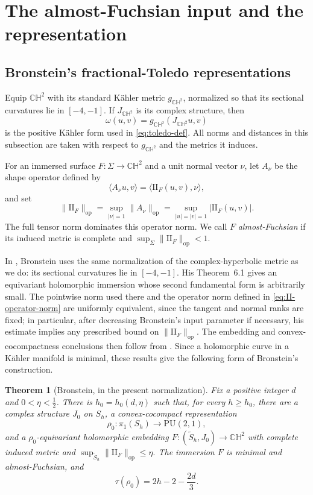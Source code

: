 \documentclass[12pt]{amsart}
\newtheorem{theorem}{Theorem}[section]
\theoremstyle{remark}
\newcommand{\CH}{\mathbb{CH}}
\newcommand{\PU}{\mathrm{PU}}
\newcommand{\II}{\mathrm{II}}
\begin{document}
\section{The almost-Fuchsian input and the representation}

\subsection{Bronstein's fractional-Toledo representations}

Equip $\CH^2$ with its standard K\"ahler metric $g_{\CH^2}$, normalized so
that its sectional curvatures lie in $[-4,-1]$.  If $J_{\CH^2}$ is its complex
structure, then
\[
 \omega(u,v)=g_{\CH^2}(J_{\CH^2}u,v)
\]
is the positive K\"ahler form used in \eqref{eq:toledo-def}.  All norms and
distances in this subsection are taken with respect to $g_{\CH^2}$ and the
metrics it induces.

For an immersed surface $F:\Sigma\to\CH^2$ and a unit normal vector $\nu$,
let $A_\nu$ be the shape operator defined by
\[
 \langle A_\nu u,v\rangle=\langle\II_F(u,v),\nu\rangle,
\]
and set
\begin{equation}\label{eq:II-operator-norm}
 \|\II_F\|_{\mathrm{op}}
 =\sup_{|\nu|=1}\|A_\nu\|_{\mathrm{op}}
 =\sup_{|u|=|v|=1}|\II_F(u,v)|.
\end{equation}
The full tensor norm dominates this operator norm.  We call $F$
\emph{almost-Fuchsian} if its induced metric is complete and
$\sup_\Sigma\|\II_F\|_{\mathrm{op}}<1$.

In \cite[Section~3]{BronsteinPU}, Bronstein uses the same normalization of the complex-hyperbolic metric as we do: its sectional curvatures lie in
$[-4,-1]$.  His Theorem~6.1 gives an equivariant holomorphic immersion whose
second fundamental form is arbitrarily small.  The pointwise norm used there
and the operator norm defined in \eqref{eq:II-operator-norm} are uniformly equivalent,
since the tangent and normal ranks are fixed; in particular, after decreasing
Bronstein's input parameter if necessary, his estimate implies any prescribed
bound on $\|\II_F\|_{\mathrm{op}}$.  The embedding and convex-cocompactness
conclusions then follow from
\cite[Theorem~3.2 and Corollary~3.3]{BronsteinPU}.  Since a holomorphic curve
in a K\"ahler manifold is minimal, these results give the following form of
Bronstein's construction.

\begin{theorem}[Bronstein, in the present normalization]\label{thm:bronstein}
Fix a positive integer $d$ and $0<\eta<\tfrac12$.  There is
$h_0=h_0(d,\eta)$ such that, for every $h\ge h_0$, there are a complex
structure $J_0$ on $S_h$, a convex-cocompact representation
\[
 \rho_0:\pi_1(S_h)\longrightarrow\PU(2,1),
\]
and a $\rho_0$-equivariant holomorphic embedding
\(
 F:(\widetilde S_h,J_0)\longrightarrow\CH^2
\)
with complete induced metric and
\(
 \sup_{\widetilde S_h}\|\II_F\|_{\mathrm{op}}\le\eta.
\)
The immersion $F$ is minimal and almost-Fuchsian, and
\begin{equation}\label{eq:bronstein-toledo}
 \tau(\rho_0)=2h-2-\frac{2d}{3}.
\end{equation}
\end{theorem}
\end{document}
